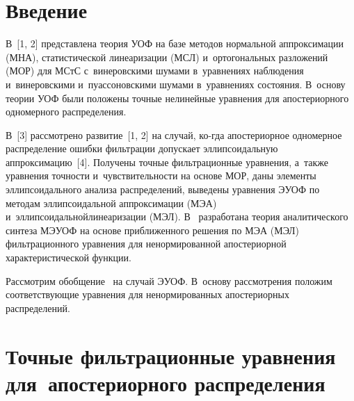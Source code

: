 \vspace*{-6pt}




\thispagestyle{headings}

\begin{multicols}{2}

\label{st\stat}

\section{Введение}

В~[1, 2] представлена теория УОФ на базе 
методов нормальной аппроксимации (МНА),
статистической линеаризации (МСЛ) и~ортогональных разложений (МОР) для 
МСтС с~винеровскими шумами 
в~уравнениях наблюдения и~винеровскими и~пуассоновскими шумами в~уравнениях со\-сто\-яния.
В~основу теории УОФ были положены точные нелинейные уравнения для апостериорного 
одномерного распределения.

В~[3] рассмотрено развитие~[1, 2] на случай, ко-\linebreak гда апостериорное одномерное 
распределение ошибки фильтрации допускает эллипсоидальную аппроксимацию~[4]. 
Получены точные фильтрационные уравнения, а~также уравнения точности\linebreak 
и~чувствительности на основе МОР, даны элементы эл\-лип\-соидального анализа 
распределений, выведены уравнения ЭУОФ по методам 
эллипсоидальной аппроксимации (МЭА) и~эллипсоидальной\linebreak линеаризации (МЭЛ).
В~\cite{6-s, 5-s} разработана теория аналитического синтеза МЭУОФ 
на основе приближенного решения по МЭА (МЭЛ) фильтрационного уравнения для 
ненормированной апостериорной характеристической функции.

\columnbreak

Рассмотрим обобщение~\cite{4-s, 5-s} на случай  ЭУОФ.  В~основу 
рассмотрения положим соответствующие  уравнения для ненормированных апостериорных 
распределений.


\section{Точные фильтрационные уравнения для~апостериорного распределения}


\end{multicols}
